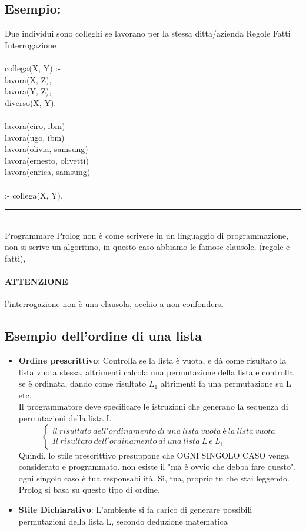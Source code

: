 \documentclass[12pt, a4paper, openany, oneside]{book}
\newcommand\tab[1][1cm]{\hspace*{#1}}
\begin{document}
\subsection{Esempio:}
Due individui sono colleghi se lavorano per la stessa ditta/azienda
\color{red} Regole \color{blue} Fatti \color{black} Interrogazione
\\ \\
\color{red}
collega(X, Y) :-  \\	
\tab lavora(X, Z), \\	
\tab lavora(Y, Z), \\	
\tab diverso(X, Y).
\\ \\
\color{blue}
lavora(ciro, ibm)  \\
lavora(ugo, ibm)  \\
lavora(olivia, samsung)  \\
lavora(ernesto, olivetti)  \\
lavora(enrica, samsung)
\\ \\
\color{black}
:- collega(X, Y). 
\\
{\color{black} \rule{\linewidth}{0.3mm} }
\\
Programmare Prolog non è come scrivere in un linguaggio di programmazione, non
si scrive un algoritmo, in questo caso abbiamo le famose clausole, (regole e 
fatti), 
\paragraph{ATTENZIONE} l'interrogazione non è una clausola, occhio a non confondersi
\subsection{Esempio dell'ordine di una lista}
\begin{itemize}
	\item \textbf{Ordine prescrittivo}: Controlla se la lista è vuota, e dà come 
	risultato la lista vuota stessa, altrimenti calcola una permutazione della 
	lista e controlla se è ordinata, dando come risultato $L_{1}$ altrimenti 
	fa una permutazione su L etc.
	\\
	Il programmatore deve specificare le istruzioni che generano la sequenza 
	di permutazioni della lista L
	\[
	\begin{cases}
	il ~ risultato ~ dell'ordinamento ~ di ~ una ~ lista ~ vuota ~ è ~ la ~ 
	lista ~ vuota \\
	Il ~ risultato ~ dell'ordinamento ~ di ~ una ~ lista ~ L ~ e ~ L_{1} 
	\end{cases}
	\]
	Quindi, lo stile prescrittivo presuppone che OGNI SINGOLO CASO venga considerato
	e programmato. non esiste il "ma è ovvio che debba fare questo", ogni singolo
	caso è tua responsabilità. Sì, tua, proprio tu che stai leggendo. Prolog si
	basa su questo tipo di ordine.
	\item \textbf{Stile Dichiarativo}: L'ambiente si fa carico di generare 
	possibili permutazioni della lista L, secondo deduzione matematica
\end{itemize}
\end{document}
